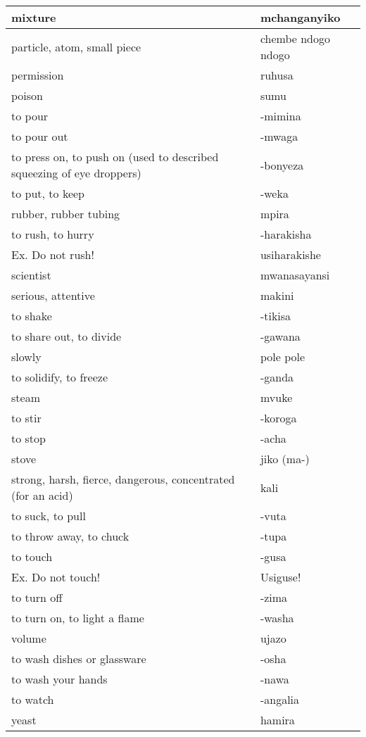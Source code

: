 \begin{center}
\begin{longtable}{|p{}|p{}|}
mixture	&	mchanganyiko	\\	\hline
particle, atom, small piece	&	chembe ndogo ndogo	\\	\hline
permission	&	ruhusa	\\	\hline
poison	&	sumu	\\	\hline
to pour	&	-mimina	\\	\hline
to pour out	&	-mwaga	\\	\hline
to press on, to push on (used to described squeezing of eye droppers)	&	-bonyeza	\\	\hline
to put, to keep	&	-weka	\\	\hline
rubber, rubber tubing	&	mpira	\\	\hline
to rush, to hurry	&	-harakisha 	\\	
        Ex. Do not rush!	&	        usiharakishe	\\	\hline
scientist	&	mwanasayansi	\\	\hline
serious, attentive	&	makini	\\	\hline
to shake	&	-tikisa	\\	\hline
to share out, to divide	&	-gawana	\\	\hline
slowly	&	pole pole	\\	\hline
to solidify, to freeze	&	-ganda	\\	\hline
steam	&	mvuke	\\	\hline
to stir	&	-koroga	\\	\hline
to stop	&	-acha	\\	\hline
stove	&	jiko (ma-)	\\	\hline
strong, harsh, fierce, dangerous, concentrated (for an acid)	&	kali	\\	\hline
to suck, to pull	&	-vuta	\\	\hline
to throw away, to chuck	&	-tupa	\\	\hline
to touch 	&	-gusa	\\	
        Ex. Do not touch!	&	        Usiguse!	\\	\hline
to turn off	&	-zima	\\	\hline
to turn on, to light a flame	&	-washa 	\\	\hline
volume	&	ujazo	\\	\hline
to wash dishes or glassware	&	-osha	\\	\hline
to wash your hands	&	-nawa	\\	\hline
to watch	&	-angalia	\\	\hline
yeast	&	hamira	\\	\hline




\end{longtable}
\end{center}